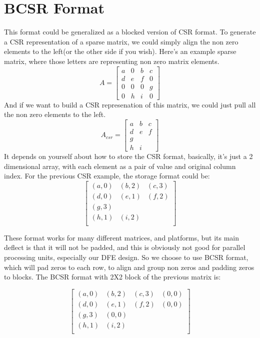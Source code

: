 \documentclass[a4paper, 10pt]{report}
\begin{document}
\section{BCSR Format}
This format could be generalized as a blocked version of CSR format. To generate a CSR representation of a sparse matrix, we could simply align the non zero elements to the left(or the other side if you wish). Here's an example sparse matrix, where those letters are representing non zero matrix elements.
\[
A = 
\begin{bmatrix}
	a & 0 & b & c \\
	d & e & f & 0 \\
	0 & 0 & 0 & g \\
	0 & h & i & 0
\end{bmatrix}
\]
And if we want to build a CSR represenation of this matrix, we could just pull all the non zero elements to the left. 
$$A_{csr} = 
\begin{bmatrix}
	a & b & c \\
	d & e & f \\
	g \\
	h & i
\end{bmatrix}
$$
It depends on yourself about how to store the CSR format, basically, it's just a 2 dimensional array, with each element as a pair of value and original column index. For the previous CSR example, the storage format could be: 
$$
\begin{bmatrix}
	(a,0) & (b,2) & (c,3) \\
	(d,0) & (e,1) & (f,2) \\
	(g,3) \\
	(h,1) & (i,2) \\
\end{bmatrix}
$$

These format works for many different matrices, and platforms, but its main deflect is that it will not be padded, and this is obviously not good for parallel processing units, especially our DFE design. So we choose to use BCSR format, which will pad zeros to each row, to align and group non zeros and padding zeros to blocks. The BCSR format with 2X2 block of the previous matrix is:

$$
\begin{bmatrix}
	(a,0) & (b,2) & (c,3) & (0,0)\\
	(d,0) & (e,1) & (f,2) & (0,0)\\
	(g,3) & (0,0) \\
	(h,1) & (i,2) \\
\end{bmatrix}
$$
\end{document}

